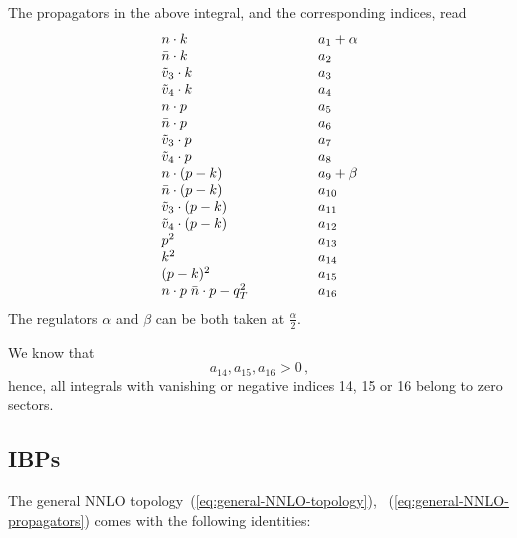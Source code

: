 \documentclass[a4paper,11pt]{article}
\numberwithin{equation}{section}
\begin{document}
The propagators in the above integral, and the corresponding indices, read
%
\begin{equation}
  \begin{array}{lp{30pt}l}
  n \cdot k     & & a_1+\alpha \\
  \nbar \cdot k & & a_2 \\
  \tilde v_3 \cdot k   & & a_3 \\
  \tilde v_4 \cdot k   & & a_4 \\
  n \cdot p     & &  a_5  \\
  \nbar \cdot p & &  a_6 \\ 
  \tilde v_3 \cdot p   & &  a_7  \\
  \tilde v_4 \cdot p   & &  a_8  \\
  n \cdot (p-k)     & &  a_9 +\beta\\
  \nbar \cdot (p-k) & &  a_{10} \\
  \tilde v_3 \cdot (p-k)   & &  a_{11} \\
  \tilde v_4 \cdot (p-k)   & &  a_{12} \\
  p^2                             & & a_{13} \\
  k^2                             & & a_{14} \\
  (p-k)^2                         & & a_{15} \\
  n\cdot p\; \nbar \cdot p -q_T^2 & & a_{16}
  \end{array}
  \label{eq:general-NNLO-propagators}
\end{equation}
%
The regulators $\alpha$ and $\beta$ can be both taken at $\frac{\alpha}{2}$.

We know that
%
\begin{equation}
 a_{14}, a_{15}, a_{16} > 0\,,
\end{equation}
%
hence, all integrals with vanishing or negative indices 14, 15 or 16 belong
to zero sectors.

\subsection{IBPs}

The general NNLO topology~(\ref{eq:general-NNLO-topology}),~
(\ref{eq:general-NNLO-propagators}) comes with the following identities:
 
\end{document}
